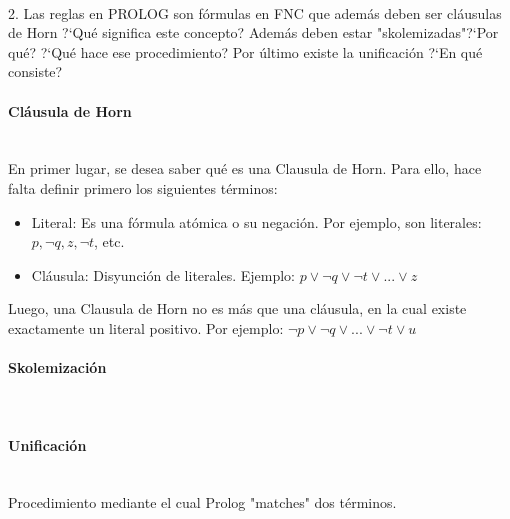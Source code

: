 \documentclass{article}
\begin{document}
\paragraph{}

2. Las reglas en PROLOG son f\'ormulas en FNC que adem\'as deben ser cl\'ausulas de Horn ?`Qu\'e significa este concepto? Adem\'as deben estar "skolemizadas"?`Por qu\'e? ?`Qu\'e hace ese procedimiento? Por \'ultimo existe la unificaci\'on ?`En qu\'e consiste?

\paragraph{Cl\'ausula de Horn}\mbox{}\\

En primer lugar, se desea saber qu\'e es una Clausula de Horn. Para ello, hace falta definir primero los siguientes t\'erminos:

\begin{itemize}

\item Literal: Es una f\'ormula at\'omica o su negaci\'on. Por ejemplo, son literales: $p, \neg q, z, \neg t$, etc.
\item Cl\'ausula: Disyunci\'on de literales. Ejemplo: $ p \lor \neg q \lor \neg t \lor ... \lor z $ 

\end{itemize}

Luego, una Clausula de Horn no es m\'as que una cl\'ausula, en la cual existe exactamente un literal positivo. Por ejemplo: $ \neg p \lor \neg q \lor ... \lor \neg t \lor u$ 

\paragraph{Skolemizaci\'on}\mbox{}\\





\paragraph{Unificaci\'on}\mbox{}\\

Procedimiento mediante el cual Prolog "matches" dos t\'erminos.


\paragraph{}
\end{document}
